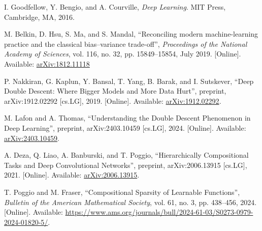 \begin{thebibliography}{99}

I. Goodfellow, Y. Bengio, and A. Courville, 
\textit{Deep Learning}. 
MIT Press, Cambridge, MA, 2016.

M. Belkin, D. Hsu, S. Ma, and S. Mandal, 
\enquote{Reconciling modern machine-learning practice and the classical bias–variance trade-off}, 
\textit{Proceedings of the National Academy of Sciences}, vol. 116, no. 32, pp. 15849–15854, July 2019. 
[Online]. Available: \href{https://arxiv.org/abs/1812.11118}{arXiv:1812.11118}

P. Nakkiran, G. Kaplun, Y. Bansal, T. Yang, B. Barak, and I. Sutskever, 
\enquote{Deep Double Descent: Where Bigger Models and More Data Hurt}, 
preprint, arXiv:1912.02292 [cs.LG], 2019. 
[Online]. Available: \href{https://arxiv.org/abs/1912.02292}{arXiv:1912.02292}.

M. Lafon and A. Thomas, 
\enquote{Understanding the Double Descent Phenomenon in Deep Learning}, 
preprint, arXiv:2403.10459 [cs.LG], 2024. 
[Online]. Available: \href{https://arxiv.org/abs/2403.10459}{arXiv:2403.10459}.

A. Deza, Q. Liao, A. Banburski, and T. Poggio, 
\enquote{Hierarchically Compositional Tasks and Deep Convolutional Networks}, 
preprint, arXiv:2006.13915 [cs.LG], 2021. 
[Online]. Available: \href{https://arxiv.org/abs/2006.13915}{arXiv:2006.13915}.

T. Poggio and M. Fraser, 
\enquote{Compositional Sparsity of Learnable Functions}, 
\textit{Bulletin of the American Mathematical Society}, vol. 61, no. 3, pp. 438–456, 2024. 
[Online]. Available: \href{https://www.ams.org/journals/bull/2024-61-03/S0273-0979-2024-01820-5/}{https://www.ams.org/journals/bull/2024-61-03/S0273-0979-2024-01820-5/}.



\end{thebibliography}